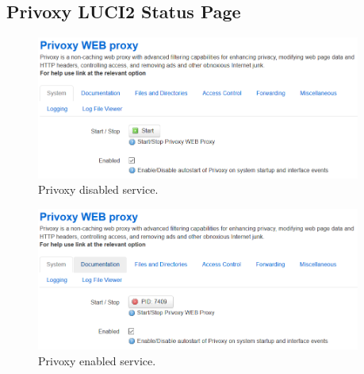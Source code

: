 \begin{appendices}
\section{Privoxy LUCI2 Status Page}
\begin{figure}[H]
    \centering
    \includegraphics[width=0.95\textwidth]{images/luciextra/disabled}
    \caption{Privoxy disabled service.}
    \label{fig:privdis}
\end{figure}

\begin{figure}[H]
    \centering
    \includegraphics[width=0.95\textwidth]{images/luciextra/enabled}
    \caption{Privoxy enabled service.}
    \label{fig:priven}
\end{figure}
\end{appendices}